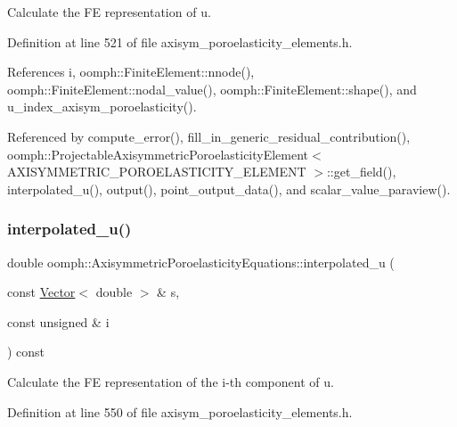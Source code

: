 Calculate the FE representation of u. 



Definition at line 521 of file axisym\+\_\+poroelasticity\+\_\+elements.\+h.



References i, oomph\+::\+Finite\+Element\+::nnode(), oomph\+::\+Finite\+Element\+::nodal\+\_\+value(), oomph\+::\+Finite\+Element\+::shape(), and u\+\_\+index\+\_\+axisym\+\_\+poroelasticity().



Referenced by compute\+\_\+error(), fill\+\_\+in\+\_\+generic\+\_\+residual\+\_\+contribution(), oomph\+::\+Projectable\+Axisymmetric\+Poroelasticity\+Element$<$ A\+X\+I\+S\+Y\+M\+M\+E\+T\+R\+I\+C\+\_\+\+P\+O\+R\+O\+E\+L\+A\+S\+T\+I\+C\+I\+T\+Y\+\_\+\+E\+L\+E\+M\+E\+N\+T $>$\+::get\+\_\+field(), interpolated\+\_\+u(), output(), point\+\_\+output\+\_\+data(), and scalar\+\_\+value\+\_\+paraview().

\mbox{\label{classoomph_1_1AxisymmetricPoroelasticityEquations_a3caa31f269c2877fb3f0502a7bcd2034}} 
\subsubsection{\texorpdfstring{interpolated\+\_\+u()}{interpolated\_u()}\hspace{0.1cm}{\footnotesize\ttfamily [2/3]}}
{\footnotesize\ttfamily double oomph\+::\+Axisymmetric\+Poroelasticity\+Equations\+::interpolated\+\_\+u (\begin{DoxyParamCaption}\item[{const \hyperlink{classoomph_1_1Vector}{Vector}$<$ double $>$ \&}]{s,  }\item[{const unsigned \&}]{i }\end{DoxyParamCaption}) const\hspace{0.3cm}{\ttfamily [inline]}}



Calculate the FE representation of the i-\/th component of u. 



Definition at line 550 of file axisym\+\_\+poroelasticity\+\_\+elements.\+h.



